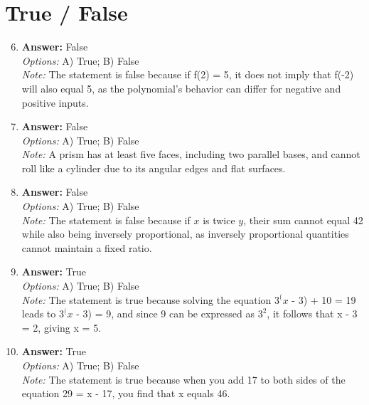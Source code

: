 \documentclass[12pt]{article}
\begin{document}
\section*{True / False}
\begin{enumerate}[label=\arabic*.]
\setcounter{enumi}{5}
\item \textbf{Answer:} False
\\ \textit{Options:} A) True; B) False
\\ \textit{Note:} The statement is false because if f(2) = 5, it does not imply that f(-2) will also equal 5, as the polynomial's behavior can differ for negative and positive inputs.
\item \textbf{Answer:} False
\\ \textit{Options:} A) True; B) False
\\ \textit{Note:} A prism has at least five faces, including two parallel bases, and cannot roll like a cylinder due to its angular edges and flat surfaces.
\item \textbf{Answer:} False
\\ \textit{Options:} A) True; B) False
\\ \textit{Note:} The statement is false because if \( x \) is twice \( y \), their sum cannot equal 42 while also being inversely proportional, as inversely proportional quantities cannot maintain a fixed ratio.
\item \textbf{Answer:} True
\\ \textit{Options:} A) True; B) False
\\ \textit{Note:} The statement is true because solving the equation $3^(x$ - 3) + 10 = 19 leads to $3^(x$ - 3) = 9, and since 9 can be expressed as $3^2$, it follows that x - 3 = 2, giving x = 5.
\item \textbf{Answer:} True
\\ \textit{Options:} A) True; B) False
\\ \textit{Note:} The statement is true because when you add 17 to both sides of the equation 29 = x - 17, you find that x equals 46.
\end{enumerate}
\end{document}

